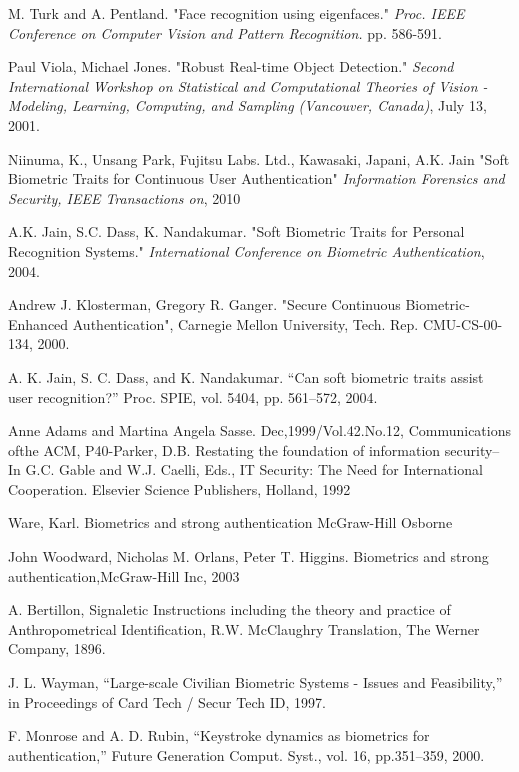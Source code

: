 \begin{thebibliography}{77}
 M. Turk and A. Pentland.
"Face recognition using eigenfaces."
\emph{Proc. IEEE Conference on Computer Vision and Pattern Recognition.} pp. 586-591.

Paul Viola, Michael Jones.
"Robust Real-time Object Detection."
\emph{Second International Workshop on Statistical and Computational Theories of Vision - Modeling, Learning, Computing, and Sampling (Vancouver, Canada)}, July 13, 2001.

 Niinuma, K., Unsang Park, Fujitsu Labs. Ltd., Kawasaki, Japani, A.K. Jain
"Soft Biometric Traits for Continuous User Authentication" 
\emph{Information Forensics and Security, IEEE Transactions on}, 2010

A.K. Jain, S.C. Dass, K. Nandakumar.
"Soft Biometric Traits for Personal Recognition Systems."
\emph{International Conference on Biometric Authentication}, 2004.

Andrew J. Klosterman, Gregory R. Ganger.
"Secure Continuous Biometric-Enhanced Authentication", 
Carnegie Mellon University, Tech. Rep. CMU-CS-00-134, 2000.

A. K. Jain, S. C. Dass, and K. Nandakumar.
“Can soft biometric traits assist user recognition?”
Proc. SPIE, vol. 5404, pp. 561–572, 2004.

Anne Adams and Martina Angela Sasse.
Dec,1999/Vol.42.No.12, Communications ofthe ACM,
P40-Parker, D.B. Restating the foundation of information security-- In G.C.
Gable and W.J. Caelli, Eds., IT Security: The Need for International Cooperation.
Elsevier Science Publishers, Holland, 1992

 Ware, Karl.
Biometrics and strong authentication McGraw-Hill Osborne

John Woodward, Nicholas M. Orlans, Peter T. Higgins.
Biometrics and strong authentication,McGraw-Hill Inc, 2003

A. Bertillon,
Signaletic Instructions including the theory and practice of Anthropometrical Identification, R.W.
McClaughry Translation, The Werner Company, 1896.

J. L. Wayman,
“Large-scale Civilian Biometric Systems - Issues and Feasibility,” in Proceedings of Card Tech /
Secur Tech ID, 1997.

F. Monrose and A. D. Rubin, 
“Keystroke dynamics as biometrics for authentication,” 
Future Generation Comput. Syst., vol. 16, pp.351–359, 2000.


\end{thebibliography}
